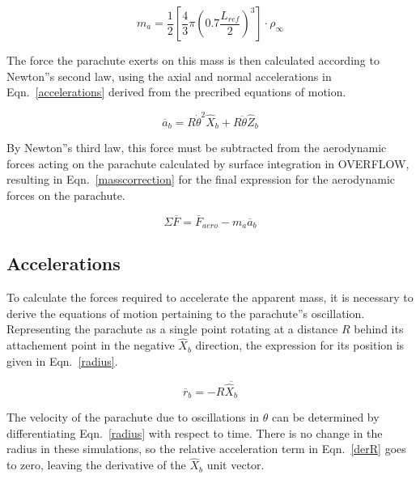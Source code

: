 \documentclass[]{aiaa-tc}%
\begin{document}
\begin{equation} \label{apparentmass}
  m_a = \frac{1}{2} \left[ \frac{4}{3}\pi \left( 0.7\frac{L_{ref}}{2} \right)^3 \right] \cdot \rho_{\infty}
\end{equation}

The force the parachute exerts on this mass is then calculated according to Newton''s second law, using the axial and normal accelerations in Eqn.~\ref{accelerations} derived from the precribed equations of motion.

\begin{equation} \label{accelerations}
  \overline{a}_b = R\dot{\theta}^2 \hat{X}_b + R\ddot{\theta} \hat{Z}_b
\end{equation}

By Newton''s third law, this force must be subtracted from the aerodynamic forces acting on the parachute calculated by surface integration in OVERFLOW, resulting in Eqn.~\ref{masscorrection} for the final expression for the aerodynamic forces on the parachute.

\begin{equation} \label{masscorrection}
  \Sigma \overline{F} = \overline{F}_{aero} - m_a\overline{a}_b
\end{equation}


\subsection{Accelerations}

To calculate the forces required to accelerate the apparent mass, it is necessary to derive the equations of motion pertaining to the parachute''s oscillation.  Representing the parachute as a single point rotating at a distance $R$ behind its attachement point in the negative $\hat{X}_b$ direction, the expression for its position is given in Eqn.~\ref{radius}.

\begin{equation} \label{radius}
  \overline{r}_b = -R \overline{\hat{X}_b}
\end{equation}

\noindent The velocity of the parachute due to oscillations in $\theta$ can be determined by differentiating Eqn.~\ref{radius} with respect to time.  There is no change in the radius in these simulations, so the relative acceleration term in Eqn.~\ref{derR} goes to zero, leaving the derivative of the $\hat{X}_b$ unit vector.
\end{document}
